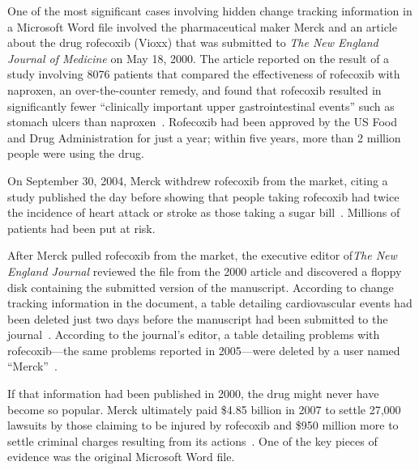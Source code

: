 One of the most significant cases involving hidden change tracking
information in a Microsoft Word file involved the pharmaceutical maker Merck and
an article about the drug rofecoxib (Vioxx) that was submitted to
\emph{The New England Journal of Medicine} on May 18, 2000. The
article reported on the result of a study involving 8076 patients that
compared the effectiveness of rofecoxib with naproxen, an
over-the-counter remedy, and found that rofecoxib resulted in
significantly fewer ``clinically important upper gastrointestinal
events'' such as stomach ulcers than
naproxen~\cite{bombardier-2000}. Rofecoxib had been approved by the US
Food and Drug Administration for just a year; within five years, more
than 2 million people were using the drug. 

On September 30, 2004, Merck withdrew rofecoxib from the market,
citing a study published the day before showing that people
taking rofecoxib had twice the incidence of heart attack or stroke as
those taking a sugar bill~\cite{npr-vioxx}. Millions of patients had
been put at risk.

After Merck pulled rofecoxib from the market, the executive editor
of\emph{The New England Journal} reviewed the file from the 2000
article and discovered a floppy disk containing the submitted version
of the manuscript. According to change tracking information in the
document, a table detailing cardiovascular events had been deleted
just two days before the manuscript had been submitted to the
journal~\cite{nejm-concern}. According to the journal's editor, a
table detailing problems with rofecoxib---the same problems reported
in 2005---were deleted by a user named
``Merck''~\cite{forbes-mercks-deleted-data}. 

If that information had
been published in 2000, the drug might never have become so popular.
Merck ultimately paid \$4.85 billion in 2007 to settle 27,000 lawsuits
by those claiming to be injured by rofecoxib and \$950 million more to
settle criminal charges resulting from its
actions~\cite{nyt-vioxx-settlement}. One of the key pieces of evidence
was the original Microsoft Word file.

% 

